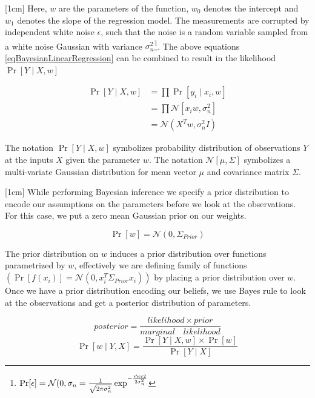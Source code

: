 [1cm]
Here, \(w\) are the parameters of the function, \(w_{0}\) denotes the intercept and \(w_{1}\) denotes the slope of the regression model. The measurements are corrupted by independent white noise \(\epsilon\), such that the noise is a random variable sampled from a white noise Gaussian with variance \(\sigma_{n}^{2}\)\footnote{\(\Pr[\epsilon] = \mathcal{N}(0, \sigma_{n} = \frac{1}{\sqrt{2\pi\sigma_{n}^{2}}}\exp^{-\frac{\epsilonç{2}}{2\sigma_{n}^{2}}}
\)}. The above equations \ref{eqBayesianLinearRegression} can be combined to result in the likelihood \(\Pr[Y\mid X, w]\)

\begin{equation}\label{eqBayesianLikelihood}
\begin{aligned}
\Pr[Y \mid X, w]  & = \prod \Pr[y_{i}\mid x_{i}, w]\\
                & = \prod \mathcal{N}[x_{i}w , \sigma_{n}^{2}]\\
                & = \mathcal{N}(X^{T} w, \sigma_{n}^{2}I)    
\end{aligned}
\end{equation}

The notation \(\Pr[Y \mid X, w]\) symbolizes probability distribution of observations \(Y\) at the inputs \(X\) given the parameter \(w\). The notation \(\mathcal{N}[\mu , \Sigma]\) symbolizes a multi-variate Gaussian distribution for mean vector \(\mu\) and covariance matrix \(\Sigma\). 

[1cm]
While performing Bayesian inference we specify a prior distribution to encode our assumptions on the parameters before we look at the observations. For this case, we put a zero mean Gaussian prior on our weights.

\begin{equation}\label{eqBayesianPrior}
\Pr[w] = \mathcal{N}(0, \Sigma_{Prior})
\end{equation}

The prior distribution on \(w\) induces a prior distribution over functions parametrized by \(w\), effectively we are defining family of functions \((\Pr[f(x_{i})] = \mathcal{N}(0, x_{i}^{T}\Sigma_{Prior}x_{i}))\) by placing a prior distribution over \(w\). Once we have a prior distribution encoding our beliefs, we use Bayes rule to look at the observations and get a posterior distribution of parameters.

\begin{equation*}
posterior = \frac{likelihood \times prior}{marginal \quad likelihood}
\end{equation*}
\begin{equation}\label{eqBayesRule}
\Pr[w \mid Y, X] = \frac{\Pr[Y \mid X, w] \times \Pr[w]}{\Pr[Y \mid X]}
\end{equation}

